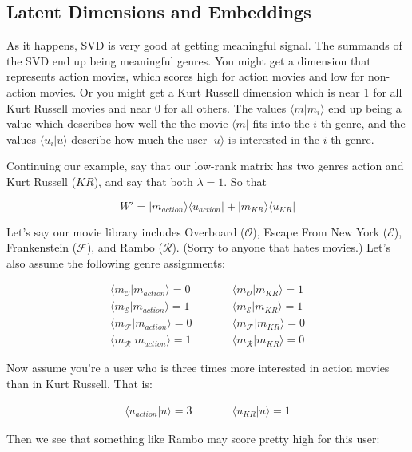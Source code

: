 \documentclass{amsbook}
\begin{document}
\subsection{Latent Dimensions and Embeddings}

As it happens, SVD is very good at getting meaningful signal.  The summands of the SVD end up being meaningful genres.  You might get a dimension that represents action movies, which scores high for action movies and low for non-action movies.  Or you might get a Kurt Russell dimension which is near $1$ for all Kurt Russell movies and near $0$ for all others.  The values $\langle m|m_i\rangle$ end up being a value which describes how well the the movie $\langle m|$ fits into the $i$-th genre, and the values $\langle u_i|u\rangle$ describe how much the user $|u\rangle$ is interested in the $i$-th genre.

Continuing our example, say that our low-rank matrix has two genres action and Kurt Russell ($KR$), and say that both $\lambda=1$.  So that

$$
W'=|m_{action}\rangle\langle u_{action}|+|m_{KR}\rangle\langle u_{KR}|
$$

Let's say our movie library includes Overboard ($\mathcal O$), Escape From New York ($\mathcal E$), Frankenstein ($\mathcal F$), and Rambo ($\mathcal R$).  (Sorry to anyone that hates movies.)  Let's also assume the following genre assignments:

$$
\begin{array}{lll}
\langle m_{\mathcal O}|m_{action}\rangle=0&\quad\quad&\langle m_{\mathcal O}|m_{KR}\rangle=1 \\
\langle m_{\mathcal E}|m_{action}\rangle=1&\quad\quad&\langle m_{\mathcal E}|m_{KR}\rangle=1 \\
\langle m_{\mathcal F}|m_{action}\rangle=0&\quad\quad&\langle m_{\mathcal F}|m_{KR}\rangle=0 \\
\langle m_{\mathcal R}|m_{action}\rangle=1&\quad\quad&\langle m_{\mathcal R}|m_{KR}\rangle=0
\end{array}
$$

Now assume you're a user who is three times more interested in action movies than in Kurt Russell.  That is:

$$
\begin{array}{lll}
\langle u_{action}|u\rangle=3&\quad\quad&\langle u_{KR}|u\rangle=1
\end{array}
$$

Then we see that something like Rambo may score pretty high for this user:
\end{document}
